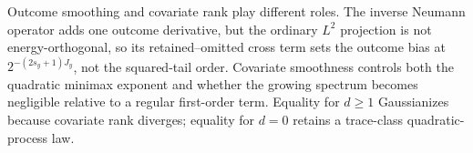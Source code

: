 Outcome smoothing and covariate rank play different roles. The inverse Neumann operator adds one outcome derivative, but the ordinary \(L^2\) projection is not energy-orthogonal, so its retained--omitted cross term sets the outcome bias at \(2^{-(2s_y+1)J_y}\), not the squared-tail order. Covariate smoothness controls both the quadratic minimax exponent and whether the growing spectrum becomes negligible relative to a regular first-order term. Equality for \(d\ge1\) Gaussianizes because covariate rank diverges; equality for \(d=0\) retains a trace-class quadratic-process law.